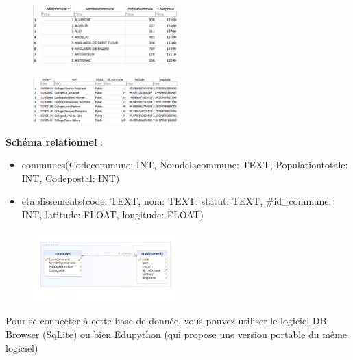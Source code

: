 \documentclass[
  letterpaper,
  DIV=11,
  numbers=noendperiod]{scrartcl}
\providecommand{\tightlist}{%
  \setlength{\itemsep}{0pt}\setlength{\parskip}{0pt}}\usepackage{longtable,booktabs,array}
\begin{document}
\begin{figure}

{\centering \includegraphics[width=0.5\textwidth,height=\textheight]{BDD9.png}

}

\end{figure}

\begin{figure}

{\centering \includegraphics[width=0.5\textwidth,height=\textheight]{BDD10.png}

}

\end{figure}

\textbf{Schéma relationnel} :

\begin{itemize}
\tightlist
\item
  communes({Codecommune}: INT, Nomdelacommune: TEXT, Populationtotale:
  INT, Codepostal: INT)
\item
  etablissements({code}: TEXT, nom: TEXT, statut: TEXT, \#id\_commune:
  INT, latitude: FLOAT, longitude: FLOAT)
\end{itemize}

\begin{figure}

{\centering \includegraphics[width=0.5\textwidth,height=\textheight]{BDD11.png}

}

\end{figure}

Pour se connecter à cette base de donnée, vous pouvez utiliser le
logiciel DB Browser (SqLite) ou bien Edupython (qui propose une version
portable du même logiciel)
\end{document}
